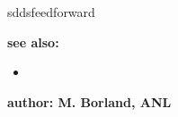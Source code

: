 \begin{sddsprog}{sddsfeedforward}
\item {\bf see also:}
    \begin{itemize}
    \item {}
    \end{itemize}
\item {\bf author: M. Borland, ANL}
\end{sddsprog}
